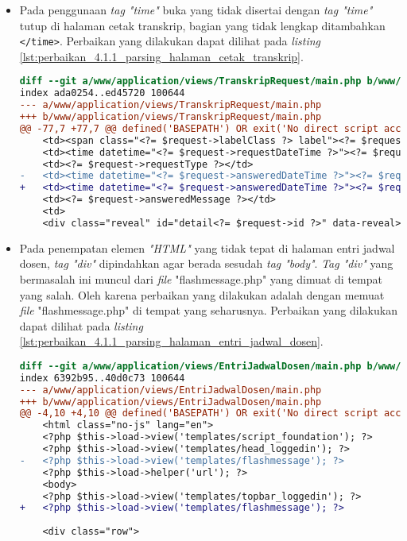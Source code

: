 \begin{itemize}
\item Pada penggunaan \textit{tag "time"} buka yang tidak disertai dengan \textit{tag "time"} tutup di halaman cetak transkrip, bagian yang tidak lengkap ditambahkan \texttt{</time>}. Perbaikan yang dilakukan dapat dilihat pada \textit{listing} \ref{lst:perbaikan_4.1.1_parsing_halaman_cetak_transkrip}.
\begin{lstlisting}[frame=single, label={lst:perbaikan_4.1.1_parsing_halaman_cetak_transkrip}, language=diff, caption=Perbaikan Kriteria Sukses 4.1.1 - Kesalahan Elemen pada Halaman Cetak Transkrip]
diff --git a/www/application/views/TranskripRequest/main.php b/www/application/views/TranskripRequest/main.php
index ada0254..ed45720 100644
--- a/www/application/views/TranskripRequest/main.php
+++ b/www/application/views/TranskripRequest/main.php
@@ -77,7 +77,7 @@ defined('BASEPATH') OR exit('No direct script access allowed');
    <td><span class="<?= $request->labelClass ?> label"><?= $request->status ?></span></td>
    <td><time datetime="<?= $request->requestDateTime ?>"><?= $request->requestDateString ?></time></td>
    <td><?= $request->requestType ?></td>
-   <td><time datetime="<?= $request->answeredDateTime ?>"><?= $request->answeredDateString ?></td>
+   <td><time datetime="<?= $request->answeredDateTime ?>"><?= $request->answeredDateString ?></time></td>
    <td><?= $request->answeredMessage ?></td>
    <td>
    <div class="reveal" id="detail<?= $request->id ?>" data-reveal>
\end{lstlisting} 

\item Pada penempatan elemen \textit{"HTML"} yang tidak tepat di halaman entri jadwal dosen, \textit{tag "div"} dipindahkan agar berada sesudah \textit{tag "body"}. \textit{Tag "div"} yang bermasalah ini muncul dari \textit{file} "flashmessage.php" yang dimuat di tempat yang salah. Oleh karena perbaikan yang dilakukan adalah dengan memuat \textit{file} "flashmessage.php" di tempat yang seharusnya. Perbaikan yang dilakukan dapat dilihat pada \textit{listing} \ref{lst:perbaikan_4.1.1_parsing_halaman_entri_jadwal_dosen}.
\begin{lstlisting}[frame=single, label={lst:perbaikan_4.1.1_parsing_halaman_entri_jadwal_dosen}, language=diff, caption=Perbaikan Kriteria Sukses 4.1.1 - Kesalahan Elemen pada Halaman Entri Jadwal Dosen]
diff --git a/www/application/views/EntriJadwalDosen/main.php b/www/application/views/EntriJadwalDosen/main.php
index 6392b95..40d0c73 100644
--- a/www/application/views/EntriJadwalDosen/main.php
+++ b/www/application/views/EntriJadwalDosen/main.php
@@ -4,10 +4,10 @@ defined('BASEPATH') OR exit('No direct script access allowed');
    <html class="no-js" lang="en">
    <?php $this->load->view('templates/script_foundation'); ?>
    <?php $this->load->view('templates/head_loggedin'); ?>
-	<?php $this->load->view('templates/flashmessage'); ?>
    <?php $this->load->helper('url'); ?>
    <body>
    <?php $this->load->view('templates/topbar_loggedin'); ?>
+   <?php $this->load->view('templates/flashmessage'); ?>
 
    <div class="row">
\end{lstlisting} 
\end{itemize}

